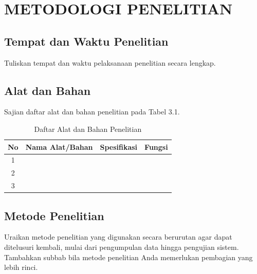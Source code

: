 %
\chapter{METODOLOGI PENELITIAN}


\section{Tempat dan Waktu Penelitian}

Tuliskan tempat dan waktu pelaksanaan penelitian secara lengkap.

\section{Alat dan Bahan}

Sajian daftar alat dan bahan penelitian pada Tabel 3.1.

\begin{table}[ht]
\centering
\caption{Daftar Alat dan Bahan Penelitian}
\begin{tabular}{cccc}
\toprule
No & Nama Alat/Bahan & Spesifikasi & Fungsi \\
\midrule
1 & & & \\
2 & & & \\
3 & & & \\
\bottomrule
\end{tabular}
\label{tab:alat-dan-bahan}
\end{table}

\section{Metode Penelitian}

Uraikan metode penelitian yang digunakan secara berurutan agar dapat
ditelusuri kembali, mulai dari pengumpulan data hingga pengujian sistem.
Tambahkan subbab bila metode penelitian Anda memerlukan pembagian yang
lebih rinci.


